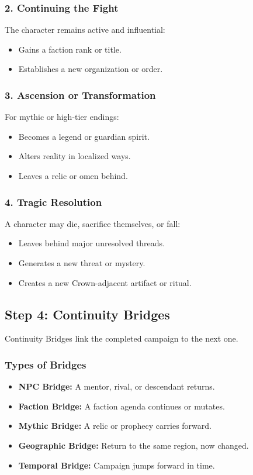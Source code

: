 \documentclass[11pt]{article}
\begin{document}
\subsubsection{2. Continuing the Fight}
The character remains active and influential:
\begin{itemize}
    \item Gains a faction rank or title.
    \item Establishes a new organization or order.
\end{itemize}

\subsubsection{3. Ascension or Transformation}
For mythic or high-tier endings:
\begin{itemize}
    \item Becomes a legend or guardian spirit.
    \item Alters reality in localized ways.
    \item Leaves a relic or omen behind.
\end{itemize}

\subsubsection{4. Tragic Resolution}
A character may die, sacrifice themselves, or fall:
\begin{itemize}
    \item Leaves behind major unresolved threads.
    \item Generates a new threat or mystery.
    \item Creates a new Crown-adjacent artifact or ritual.
\end{itemize}

\subsection{Step 4: Continuity Bridges}

Continuity Bridges link the completed campaign to the next one.

\subsubsection{Types of Bridges}
\begin{itemize}
    \item \textbf{NPC Bridge:} A mentor, rival, or descendant returns.
    \item \textbf{Faction Bridge:} A faction agenda continues or mutates.
    \item \textbf{Mythic Bridge:} A relic or prophecy carries forward.
    \item \textbf{Geographic Bridge:} Return to the same region, now changed.
    \item \textbf{Temporal Bridge:} Campaign jumps forward in time.
\end{itemize}
\end{document}
